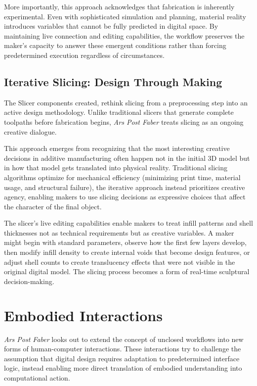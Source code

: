 \vspace{0.5cm}

More importantly, this approach acknowledges that fabrication is inherently experimental. Even with sophisticated simulation and planning, material reality introduces variables that cannot be fully predicted in digital space. By maintaining live connection and editing capabilities, the workflow preserves the maker's capacity to answer these emergent conditions rather than forcing predetermined execution regardless of circumstances.

\subsection{Iterative Slicing: Design Through Making}

The Slicer components created, rethink slicing from a preprocessing step into an active design methodology. Unlike traditional slicers that generate complete toolpaths before fabrication begins, \textit{Ars Post Faber} treats slicing as an ongoing creative dialogue.

\vspace{0.5cm}

This approach emerges from recognizing that the most interesting creative decisions in additive manufacturing often happen not in the initial 3D model but in how that model gets translated into physical reality. Traditional slicing algorithms optimize for mechanical efficiency (minimizing print time, material usage, and structural failure), the iterative approach instead prioritizes creative agency, enabling makers to use slicing decisions as expressive choices that affect the character of the final object.

\vspace{0.5cm}

The slicer's live editing capabilities enable makers to treat infill patterns and shell thicknesses not as technical requirements but as creative variables. A maker might begin with standard parameters, observe how the first few layers develop, then modify infill density to create internal voids that become design features, or adjust shell counts to create translucency effects that were not visible in the original digital model. The slicing process becomes a form of real-time sculptural decision-making.


\section{Embodied Interactions} 
\textit{Ars Post Faber} looks out to extend the concept of unclosed workflows into new forms of human-computer interactions. These interactions try to challenge the assumption that digital design requires adaptation to predetermined interface logic, instead enabling more direct translation of embodied understanding into computational action.

